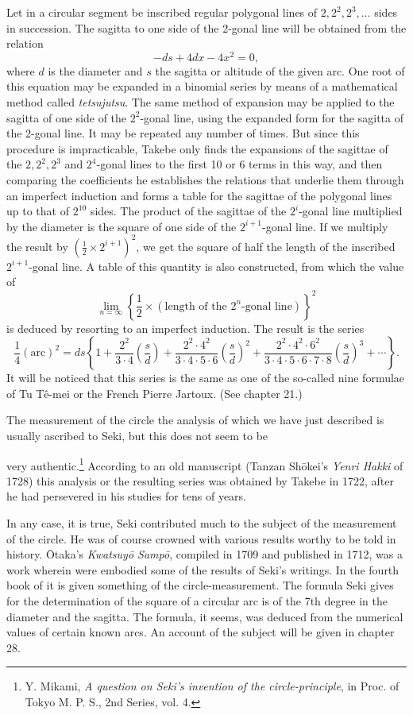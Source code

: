 \documentclass[11pt]{article}
\newcommand{\scanpage}[2]{\clearpage\setcounter{footnote}{0}\noindent{\footnotesize\color{gray}PDF page #1 · #2}\par\medskip}
\newcommand{\scanfooter}{}
\begin{document}
Let in a circular segment be inscribed regular polygonal lines of $2,2^2,2^3,\ldots$ sides in succession. The sagitta to one side of the 2-gonal line will be obtained from the relation
\[
-ds+4dx-4x^2=0,
\]
where $d$ is the diameter and $s$ the sagitta or altitude of the given arc. One root of this equation may be expanded in a binomial series by means of a mathematical method called \emph{tetsujutsu}. The same method of expansion may be applied to the sagitta of one side of the $2^2$-gonal line, using the expanded form for the sagitta of the 2-gonal line. It may be repeated any number of times. But since this procedure is impracticable, Takebe only finds the expansions of the sagittae of the $2,2^2,2^3$ and $2^4$-gonal lines to the first 10 or 6 terms in this way, and then comparing the coefficients he establishes the relations that underlie them through an imperfect induction and forms a table for the sagittae of the polygonal lines up to that of $2^{10}$ sides. The product of the sagittae of the $2^i$-gonal line multiplied by the diameter is the square of one side of the $2^{i+1}$-gonal line. If we multiply the result by $\left(\frac12\times2^{i+1}\right)^2$, we get the square of half the length of the inscribed $2^{i+1}$-gonal line. A table of this quantity is also constructed, from which the value of
\[
\lim_{n=\infty}\left\{\frac12\times(\text{length of the }2^n\text{-gonal line})\right\}^{2}
\]
is deduced by resorting to an imperfect induction. The result is the series
\[
\frac14(\mathrm{arc})^2
=ds\left\{1+\frac{2^2}{3\cdot4}\left(\frac{s}{d}\right)
+\frac{2^2\cdot4^2}{3\cdot4\cdot5\cdot6}\left(\frac{s}{d}\right)^2
+\frac{2^2\cdot4^2\cdot6^2}{3\cdot4\cdot5\cdot6\cdot7\cdot8}\left(\frac{s}{d}\right)^3+\cdots\right\}.
\]
It will be noticed that this series is the same as one of the so-called nine formulae of Tu Tê-mei or the French Pierre Jartoux. (See chapter 21.)

The measurement of the circle the analysis of which we have just described is usually ascribed to Seki, but this does not seem to be
\scanfooter

\scanpage{0179}{Chapter 22, printed page 165}
very authentic.\footnote{Y. Mikami, \emph{A question on Seki's invention of the circle-principle}, in Proc. of Tokyo M. P. S., 2nd Series, vol. 4.} According to an old manuscript (Tanzan Shōkei's \emph{Yenri Hakki} of 1728) this analysis or the resulting series was obtained by Takebe in 1722, after he had persevered in his studies for tens of years.

In any case, it is true, Seki contributed much to the subject of the measurement of the circle. He was of course crowned with various results worthy to be told in history. Ōtaka's \emph{Kwatsuyō Sampō}, compiled in 1709 and published in 1712, was a work wherein were embodied some of the results of Seki's writings. In the fourth book of it is given something of the circle-measurement. The formula Seki gives for the determination of the square of a circular arc is of the 7th degree in the diameter and the sagitta. The formula, it seems, was deduced from the numerical values of certain known arcs. An account of the subject will be given in chapter 28.
\end{document}
